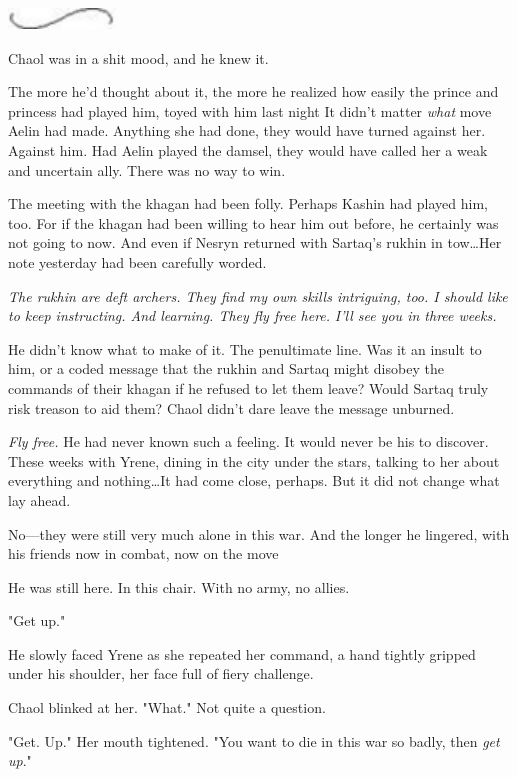 \begin{center}
	\includegraphics[width=1.12in,height=0.24in]{images/seperator}
\end{center}

Chaol was in a shit mood, and he knew it.

The more he'd thought about it, the more he realized how easily the prince and princess had played him, toyed with him last night 
It didn't matter \emph{what} move Aelin had made.
Anything she had done, they would have turned against her.
Against him.
Had Aelin played the damsel, they would have called her a weak and uncertain ally.
There was no way to win.

The meeting with the khagan had been folly.
Perhaps Kashin had played him, too.
For if the khagan had been willing to hear him out before, he certainly was not going to now.
And even if Nesryn returned with Sartaq's rukhin in tow\ldots Her note yesterday had been carefully worded.

\emph{The rukhin are deft archers.
They find my own skills intriguing, too.
I should like to keep instructing.
And learning.
They fly free here.} \emph{I'll see you in three weeks.}

He didn't know what to make of it.
The penultimate line.
Was it an insult to him, or a coded message that the rukhin and Sartaq might disobey the commands of their khagan if he refused to let them leave?
Would Sartaq truly risk treason to aid them?
Chaol didn't dare leave the message unburned.

\emph{Fly free.} He had never known such a feeling.
It would never be his to discover.
These weeks with Yrene, dining in the city under the stars, talking to her about everything and nothing\ldots It had come close, perhaps.
But it did not change what lay ahead.

No---they were still very much alone in this war.
And the longer he lingered, with his friends now in combat, now on the move 

He was still here.
In this chair.
With no army, no allies.

"Get up."

He slowly faced Yrene as she repeated her command, a hand tightly gripped under his shoulder, her face full of fiery challenge.

Chaol blinked at her.
"What."
Not quite a question.

"Get.
Up."
Her mouth tightened.
"You want to die in this war so badly, then \emph{get up}."

